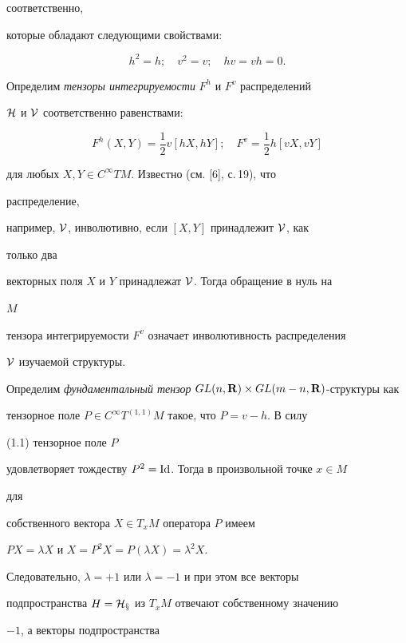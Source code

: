 соответственно, 


которые обладают следующими свойствами: 


\begin{equation} 


h^2=h;\quad v^2=v;\quad hv=vh=0. 


\end{equation} 


 


Определим {\it тензоры интегрируемости} $F^h$ и $F^v$ распределений 


$\cal H$ и $\cal V$ соответственно равенствами: 


$$ 


F^h(X,Y)=\frac{1}{2}v[hX,hY];\quad 


F^v=\frac{1}{2}h[vX,vY] 


$$ 


для любых $X,Y\in C^\infty TM$. Известно (см. [6], с.\,19), что 


распределение, 


например, $\cal V$, инволютивно, если $[X,Y]$ принадлежит $\cal V$, как 


только два 


векторных поля $X$ и $Y$ принадлежат $\cal V$. Тогда обращение в нуль на 


$M$ 


тензора интегрируемости $F^v$ означает инволютивность распределения 


$\cal V$ изучаемой структуры. 


 


Определим {\it фундаментальный тензор} $GL(n,\bold R)\times GL(m-n,\bold R)$-структуры как 


тензорное поле $P\in C^\infty T^{(1,1)}M$ такое, что $P=v-h$. В силу 


(1.1) тензорное поле $P$ 


удовлетворяет тождеству $P^2=\operatorname{Id}$. Тогда в произвольной точке $x\in M$ 


для 


собственного вектора $X\in T_x M$ оператора $P$ имеем 


$PX=\lambda X$ и $X=P^2X=P(\lambda X)=\lambda^2X$. 


Следовательно, $\lambda=+1$ или $\lambda=-1$ и при этом все векторы 


подпространства $H=\cal H_x$ из $T_x M$ отвечают собственному значению 


$-1$, а векторы подпространства 


